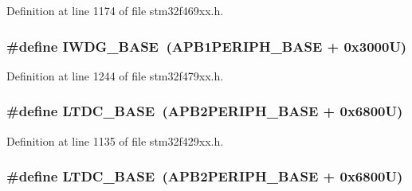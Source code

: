 Definition at line 1174 of file stm32f469xx.\+h.

\subsubsection[{\texorpdfstring{I\+W\+D\+G\+\_\+\+B\+A\+SE}{IWDG_BASE}}]{\setlength{\rightskip}{0pt plus 5cm}\#define I\+W\+D\+G\+\_\+\+B\+A\+SE~({\bf A\+P\+B1\+P\+E\+R\+I\+P\+H\+\_\+\+B\+A\+SE} + 0x3000\+U)}\hypertarget{group___peripheral__memory__map_ga8543ee4997296af5536b007cd4748f55}{}\label{group___peripheral__memory__map_ga8543ee4997296af5536b007cd4748f55}


Definition at line 1244 of file stm32f479xx.\+h.

\subsubsection[{\texorpdfstring{L\+T\+D\+C\+\_\+\+B\+A\+SE}{LTDC_BASE}}]{\setlength{\rightskip}{0pt plus 5cm}\#define L\+T\+D\+C\+\_\+\+B\+A\+SE~({\bf A\+P\+B2\+P\+E\+R\+I\+P\+H\+\_\+\+B\+A\+SE} + 0x6800\+U)}\hypertarget{group___peripheral__memory__map_gac6e45c39fafa3e82cdedbf447b461704}{}\label{group___peripheral__memory__map_gac6e45c39fafa3e82cdedbf447b461704}


Definition at line 1135 of file stm32f429xx.\+h.

\subsubsection[{\texorpdfstring{L\+T\+D\+C\+\_\+\+B\+A\+SE}{LTDC_BASE}}]{\setlength{\rightskip}{0pt plus 5cm}\#define L\+T\+D\+C\+\_\+\+B\+A\+SE~({\bf A\+P\+B2\+P\+E\+R\+I\+P\+H\+\_\+\+B\+A\+SE} + 0x6800\+U)}\hypertarget{group___peripheral__memory__map_gac6e45c39fafa3e82cdedbf447b461704}{}\label{group___peripheral__memory__map_gac6e45c39fafa3e82cdedbf447b461704}


